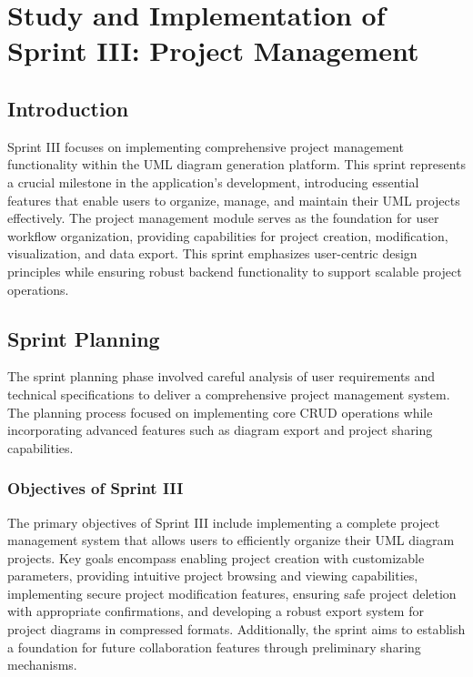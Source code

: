 \chapter[Sprint III]{Study and Implementation of Sprint III: Project Management}


\section{Introduction}

Sprint III focuses on implementing comprehensive project management functionality within the UML diagram generation platform. This sprint represents a crucial milestone in the application's development, introducing essential features that enable users to organize, manage, and maintain their UML projects effectively. The project management module serves as the foundation for user workflow organization, providing capabilities for project creation, modification, visualization, and data export. This sprint emphasizes user-centric design principles while ensuring robust backend functionality to support scalable project operations.

\section{Sprint Planning}

The sprint planning phase involved careful analysis of user requirements and technical specifications to deliver a comprehensive project management system. The planning process focused on implementing core CRUD operations while incorporating advanced features such as diagram export and project sharing capabilities.

\subsection{Objectives of Sprint III}

The primary objectives of Sprint III include implementing a complete project management system that allows users to efficiently organize their UML diagram projects. Key goals encompass enabling project creation with customizable parameters, providing intuitive project browsing and viewing capabilities, implementing secure project modification features, ensuring safe project deletion with appropriate confirmations, and developing a robust export system for project diagrams in compressed formats. Additionally, the sprint aims to establish a foundation for future collaboration features through preliminary sharing mechanisms.

